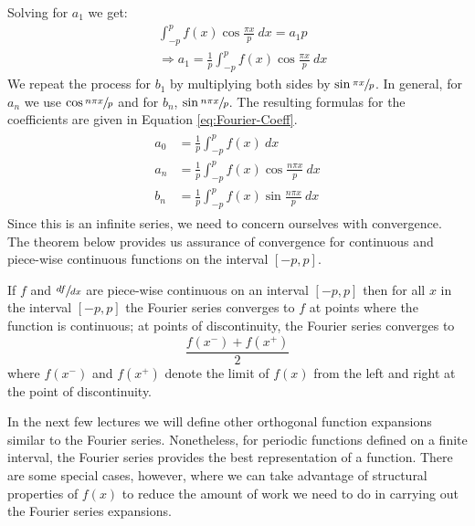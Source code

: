 Solving for $a_1$ we get:
\begin{align*}
&\int_{-p}^{p} f(x)\cos{\frac{\pi x}{p}} \ dx =a_1 p \\
& \Rightarrow a_1 = \frac{1}{p}\int_{-p}^{p} f(x)\cos{\frac{\pi x}{p}} \ dx
\end{align*}
We repeat the process for $b_1$ by multiplying both sides by $\sin{\sfrac{\pi x}{p}}$.  In general, for $a_n$ we use $\cos{\sfrac{n \pi x}{p}}$ and for $b_n$, $\sin{\sfrac{n \pi x}{p}}$.  The resulting formulas for the coefficients are given in Equation \ref{eq:Fourier-Coeff}.
\begin{align}
\begin{split}
a_0 &= \frac{1}{p}\int_{-p}^{p} f(x) \ dx \\
a_n &= \frac{1}{p}\int_{-p}^{p} f(x) \cos{\frac{n \pi x}{p}} \ dx \\
b_n &= \frac{1}{p}\int_{-p}^{p} f(x) \sin{\frac{n \pi x}{p}} \ dx 
\end{split}
\label{eq:Fourier-Coeff}
\end{align}
Since this is an infinite series, we need to concern ourselves with convergence.  The theorem below provides us assurance of convergence for continuous and piece-wise continuous functions on the interval $[-p,p]$.  
\vspace{4.0cm}

\begin{theorem}
If $f$ and $\sfrac{df}{dx}$ are piece-wise continuous on an interval $[-p,p]$ then for all $x$ in the interval $[-p,p]$ the Fourier series converges to $f$ at points where the function is continuous; at points of discontinuity, the Fourier series converges to 
\begin{equation*}
\frac{f(x^{-}) + f(x^+)}{2}
\end{equation*}
where $f(x^-)$ and $f(x^+)$ denote the limit of $f(x)$ from the left and right at the point of discontinuity.
\end{theorem}
In the next few lectures we will define other orthogonal function expansions similar to the Fourier series.  Nonetheless, for periodic functions defined on a finite interval, the Fourier series provides the best representation of a function.  There are some special cases, however, where we can take advantage of structural properties of $f(x)$ to reduce the amount of work we need to do in carrying out the Fourier series expansions.

